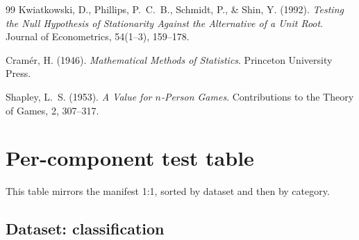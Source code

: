 \documentclass[11pt,a4paper]{article}
\begin{document}
\begin{thebibliography}{99}
Kwiatkowski, D., Phillips, P.~C.~B., Schmidt, P., \& Shin, Y. (1992).
\emph{Testing the Null Hypothesis of Stationarity Against the Alternative of a Unit Root}.
Journal of Econometrics, 54(1--3), 159--178.

Cram\'er, H. (1946).
\emph{Mathematical Methods of Statistics}.
Princeton University Press.

Shapley, L.~S. (1953).
\emph{A Value for $n$-Person Games}.
Contributions to the Theory of Games, 2, 307--317.
\end{thebibliography}


\appendix

\section{Per-component test table}

This table mirrors the manifest 1:1, sorted by dataset and then by category.


\subsection*{Dataset: classification}
\end{document}
